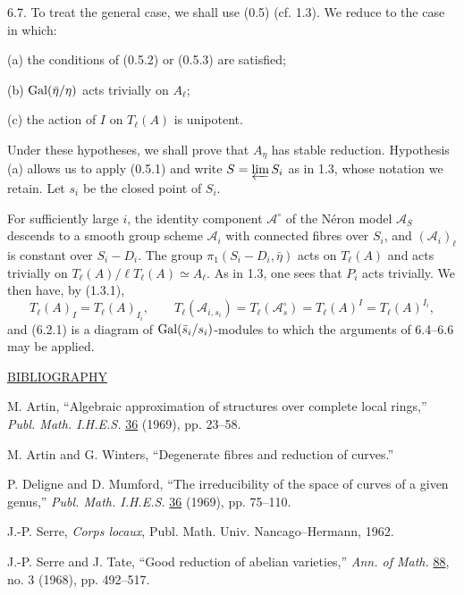 6.7. To treat the general case, we shall use (0.5) (cf. 1.3). We reduce
to the case in which:


(a) the conditions of (0.5.2) or (0.5.3) are satisfied;

(b) $\operatorname{Gal}(\bar\eta/\eta)$ acts trivially on $A_\ell$;

(c) the action of $I$ on $T_\ell(A)$ is unipotent.

Under these hypotheses, we shall prove that $A_\eta$ has stable
reduction. Hypothesis (a) allows us to apply (0.5.1) and write
$S=\varprojlim S_i$ as in 1.3, whose notation we retain. Let $s_i$ be
the closed point of $S_i$.

For sufficiently large $i$, the identity component $\mathcal A^\circ$
of the N\'eron model $\mathcal A_S$ descends to a smooth group scheme
$\mathcal A_i$ with connected fibres over $S_i$, and
$(\mathcal A_i)_\ell$ is constant over $S_i-D_i$. The group
$\pi_1(S_i-D_i,\bar\eta)$ acts on $T_\ell(A)$ and acts trivially on
$T_\ell(A)/\ell T_\ell(A)\simeq A_\ell$. As in 1.3, one sees that
$P_i$ acts trivially. We then have, by (1.3.1),
\[
 T_\ell(A)_I=T_\ell(A)_{I_i},\qquad
 T_\ell(\mathcal A_{i,s_i})=T_\ell(\mathcal A^\circ_s)
 =T_\ell(A)^I=T_\ell(A)^{I_i},
\]
and (6.2.1) is a diagram of $\operatorname{Gal}(\bar s_i/s_i)$-modules to which the
arguments of 6.4--6.6 may be applied.


\begin{center}
\underline{BIBLIOGRAPHY}
\end{center}

\begin{enumerate}[label={[\arabic*]},leftmargin=3em]
\item M. Artin, ``Algebraic approximation of structures over complete
local rings,'' \emph{Publ. Math. I.H.E.S.} \underline{36} (1969),
pp. 23--58.

\item M. Artin and G. Winters, ``Degenerate fibres and reduction of
curves.''

\item P. Deligne and D. Mumford, ``The irreducibility of the space of
curves of a given genus,'' \emph{Publ. Math. I.H.E.S.} \underline{36}
(1969), pp. 75--110.

\item J.-P. Serre, \emph{Corps locaux}, Publ. Math. Univ.
Nancago--Hermann, 1962.

\item J.-P. Serre and J. Tate, ``Good reduction of abelian varieties,''
\emph{Ann. of Math.} \underline{88}, no. 3 (1968), pp. 492--517.
\end{enumerate}
